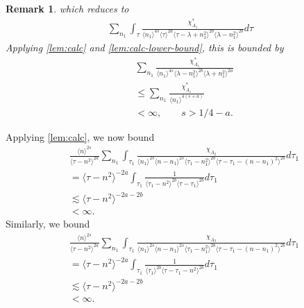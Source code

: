 \documentclass[12pt,reqno]{amsart}
\numberwithin{equation}{section}  %
\newtheorem{remark}[theorem]{Remark}
\begin{document}
\begin{framed}
\begin{remark}
%
%
which reduces to 
\begin{equation*}
\begin{split}
  \sum_{n_{1}} \int_{\tau} \frac{\chi^{*}_{A_{1}}}{\langle n_{1} \rangle
  ^{4s} \langle \tau \rangle ^{2a} \langle \tau - \lambda + n_{1}^{2} \rangle^{2b}
   \langle \lambda  - n_{1}^{2} \rangle^{2b} } d \tau
\end{split}
\end{equation*}
Applying \cref{lem:calc} and \cref{lem:calc-lower-bound}, this is bounded by
%
\begin{equation*}
\begin{split}
  & \sum_{n_{1}} \frac{\chi^{*}_{A_{1}}}{\langle n_{1} \rangle ^{4s} \langle
  \lambda- n_{1}^{2} \rangle^{2b}  \langle \lambda + n_{1}^{2} \rangle
  ^{2a}}
  \\
  & \le \sum_{n_{1}}  \frac{\chi_{A_{1}}^{*}}{\langle n_{1} \rangle^{4(s + a )}}
  \\
  & < \infty, \qquad s > 1/4 - a.
\end{split}
\end{equation*}
%
%
%
\end{remark}
\end{framed}
%
Applying \cref{lem:calc}, we now bound 
\begin{equation*}
  \begin{split}
    & \frac{ \langle n
    \rangle ^{2s}}{\langle \tau - n^{2} \rangle ^{2a}}
    \sum_{n_{1}} \int_{\tau_{1}} \frac{\chi_{A_{2}}}{ \langle n_{1} \rangle ^{2s} \langle n-n_{1} \rangle ^{2s} 
    \langle \tau_{1} - n_{1}^{2} \rangle^{2b} \langle  \tau - \tau_{1} -
    (n - n_{1})^{2} \rangle^{2b} }
    d \tau_1 
    \\
    & = 
    \langle \tau -n^{2} \rangle ^{-2a}\int_{\tau_{1}} \frac{1}{\langle \tau_{1} -
  n^{2} \rangle^{2b} \langle
  \tau - \tau_{1}\rangle^{2b} }d \tau_{1}
  \\
  & \lesssim 
  \langle \tau - n^{2} \rangle ^{-2a-2b} 
  \\
  & < \infty.
\end{split}
\end{equation*}
%
%
Similarly, we bound
%
%
\begin{equation}
\begin{split}
  & \frac{ \langle n
    \rangle ^{2s}}{\langle \tau - n^{2} \rangle ^{2a}}
    \sum_{n_{1}} \int_{\tau_{1}} \frac{\chi_{A_{3}}}{ \langle n_{1} \rangle ^{2s} \langle n-n_{1} \rangle ^{2s} 
    \langle \tau_{1} - n_{1}^{2} \rangle^{2b} \langle  \tau - \tau_{1} -
    (n - n_{1})^{2} \rangle^{2b} }
    d \tau_1 
    \\
  & = \langle \tau - n^{2} \rangle ^{-2a}
  \int_{\tau_{1}} \frac{1}{ \langle \tau_{1} \rangle^{2b}  \langle \tau -
  \tau_{1} - n^{2} \rangle^{2b}}
d \tau_1 
\\
  & \lesssim   \langle \tau - n^{2} \rangle ^{-2a-2b} 
  \\
  & < \infty.
	\end{split}
\end{equation}
\end{document}
